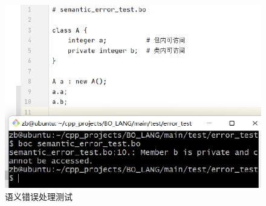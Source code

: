 \begin{figure}[H]
    \centering\includegraphics[width=13cm]{figure/test_semantic_error.pdf}
    \caption{语义错误处理测试}
    \label{fig_test_semantic_error}
\end{figure}









\let\nterm\undefined
\let\term\undefined
\let\filename\undefined







